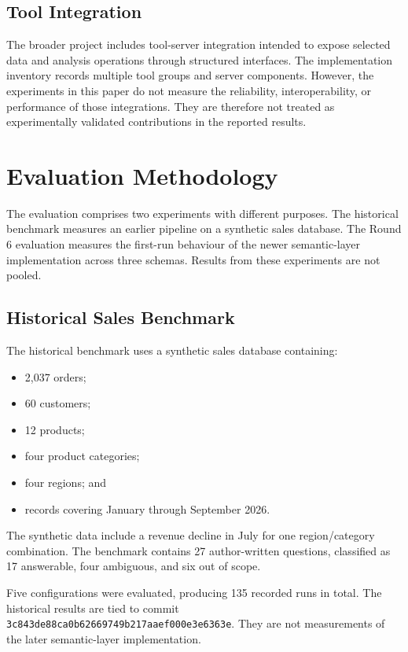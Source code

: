 \documentclass[conference]{IEEEtran}
\providecommand{\tightlist}{\setlength{\itemsep}{0pt}\setlength{\parskip}{0pt}}
\begin{document}
\subsection{Tool Integration}

The broader project includes tool-server integration intended to expose selected data and analysis operations through structured interfaces. The implementation inventory records multiple tool groups and server components. However, the experiments in this paper do not measure the reliability, interoperability, or performance of those integrations. They are therefore not treated as experimentally validated contributions in the reported results.

\section{Evaluation Methodology}

The evaluation comprises two experiments with different purposes. The historical benchmark measures an earlier pipeline on a synthetic sales database. The Round 6 evaluation measures the first-run behaviour of the newer semantic-layer implementation across three schemas. Results from these experiments are not pooled.

\subsection{Historical Sales Benchmark}

The historical benchmark uses a synthetic sales database containing:

\begin{itemize}
\tightlist
\item
  2,037 orders;
\item
  60 customers;
\item
  12 products;
\item
  four product categories;
\item
  four regions; and
\item
  records covering January through September 2026.
\end{itemize}

The synthetic data include a revenue decline in July for one region/category combination. The benchmark contains 27 author-written questions, classified as 17 answerable, four ambiguous, and six out of scope.

Five configurations were evaluated, producing 135 recorded runs in total. The historical results are tied to commit \texttt{3c843de88c\allowbreak{}a0b6266974\allowbreak{}9b217aaef0\allowbreak{}00e3e6363e}. They are not measurements of the later semantic-layer implementation.
\end{document}
